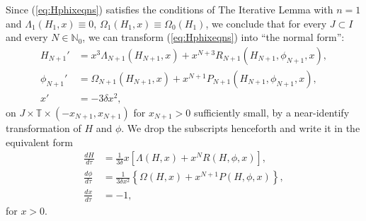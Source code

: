 \documentclass[reqno,12pt]{amsart}
\newcommand{\eqlab}[1]{\label{eq:#1}}
\renewcommand{\eqref}[1]{(\ref{eq:#1})}
\numberwithin{equation}{section}
\begin{document}
Since \eqref{Hphixeqns} satisfies the conditions of The Iterative Lemma with $n=1$ and $\Lambda_1(H_1,x)\equiv 0$, $\Omega_1(H_1,x)\equiv \Omega_0(H_1)$, we conclude that for every $J\subset I$ and every $N\in \mathbb N_0$, we can transform \eqref{Hphixeqns} into ``the normal form'':
\begin{equation}\eqlab{HNphixeqns0}
 \begin{aligned}
 {H}_{N+1}' &= x^3 \Lambda_{N+1}(H_{N+1},x)+x^{N+3} R_{N+1}(H_{N+1},\phi_{N+1},x),\\
 \phi_{N+1}' & = \Omega_{N+1}(H_{N+1},x)+x^{N+1} P_{N+1}(H_{N+1},\phi_{N+1},x),\\
 x' &= -3\delta x^2,
\end{aligned}
\end{equation}
on $J\times \mathbb T\times (-x_{N+1},x_{N+1})$ for $x_{N+1}>0$ sufficiently small, by a near-identify transformation of $H$ and $\phi$. We drop the subscripts henceforth and write it in the equivalent form
\begin{equation}\eqlab{HNphixeqns}
\begin{aligned}
 \frac{dH}{d\tau} &= \frac{1}{3\delta} x\left[ \Lambda(H,x)+x^{N} R(H,\phi,x)\right],\\
 \frac{d\phi}{d\tau} & = \frac{1}{3\delta x^2} \left\{\Omega(H,x)+x^{N+1} P(H,\phi,x)\right\},\\
 \frac{dx}{d\tau}&=-1,
\end{aligned}
\end{equation}
for $x>0$. 
\end{document}
